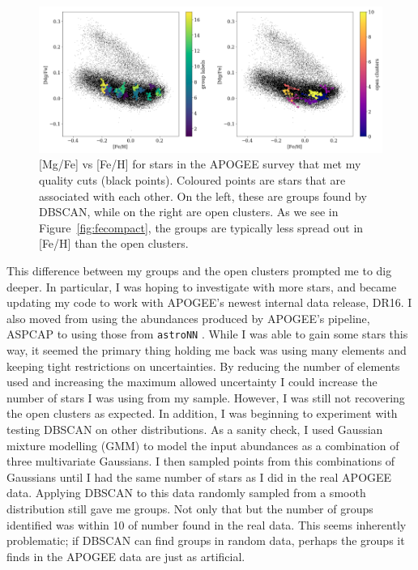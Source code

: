 \documentclass[11pt]{article}
\begin{document}
\begin{figure}
  \begin{center}
    \includegraphics[width=\textwidth]{mgvsfe.png}
  \end{center}
  \caption{[Mg/Fe] vs [Fe/H] for stars in the APOGEE survey that met my quality cuts (black points). Coloured points are stars that are associated with each other. On the left, these are groups found by DBSCAN, while on the right are open clusters. As we see in Figure~\ref{fig:fecompact}, the groups are typically less spread out in [Fe/H] than the open clusters. }
  \label{fig:alphafe}
\end{figure}

This difference between my groups and the open clusters prompted me to dig deeper. In particular, I was hoping to investigate with more stars, and became updating my code to work with APOGEE's newest internal data release, DR16. I also moved from using the abundances produced by APOGEE's pipeline, ASPCAP \citep{aspcap} to using those from \texttt{astroNN} \citep{astronn}. While I was able to gain some stars this way, it seemed the primary thing holding me back was using many elements and keeping tight restrictions on uncertainties. By reducing the number of elements used and increasing the maximum allowed uncertainty I could increase the number of stars I was using from my sample. However, I was still not recovering the open clusters as expected. In addition, I was beginning to experiment with testing DBSCAN on other distributions. As a sanity check, I used Gaussian mixture modelling (GMM) to model the input abundances as a combination of three multivariate Gaussians. I then sampled points from this combinations of Gaussians until I had the same number of stars as I did in the real APOGEE data. Applying DBSCAN to this data randomly sampled from a smooth distribution still gave me groups. Not only that but the number of groups identified was within 10 of number found in the real data. This seems inherently problematic; if DBSCAN can find groups in random data, perhaps the groups it finds in the APOGEE data are just as artificial.
\end{document}
